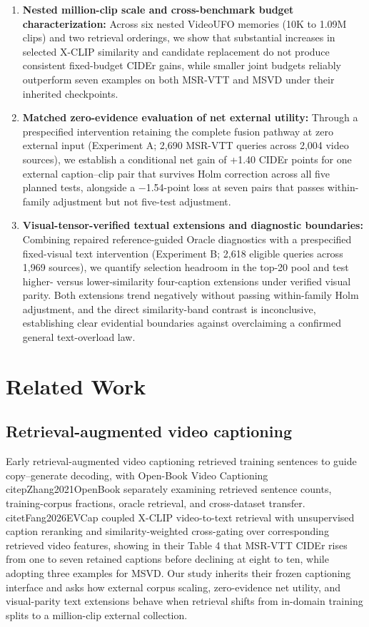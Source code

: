 \documentclass[11pt,a4paper]{article}
\begin{document}
\begin{enumerate}
\item \textbf{Nested million-clip scale and cross-benchmark budget characterization:} Across six nested VideoUFO memories (10K to 1.09M clips) and two retrieval orderings, we show that substantial increases in selected X-CLIP similarity and candidate replacement do not produce consistent fixed-budget CIDEr gains, while smaller joint budgets reliably outperform seven examples on both MSR-VTT and MSVD under their inherited checkpoints.
\item \textbf{Matched zero-evidence evaluation of net external utility:} Through a prespecified intervention retaining the complete fusion pathway at zero external input (Experiment A; 2,690 MSR-VTT queries across 2,004 video sources), we establish a conditional net gain of +1.40 CIDEr points for one external caption--clip pair that survives Holm correction across all five planned tests, alongside a $-$1.54-point loss at seven pairs that passes within-family adjustment but not five-test adjustment.
\item \textbf{Visual-tensor-verified textual extensions and diagnostic boundaries:} Combining repaired reference-guided Oracle diagnostics with a prespecified fixed-visual text intervention (Experiment B; 2,618 eligible queries across 1,969 sources), we quantify selection headroom in the top-20 pool and test higher- versus lower-similarity four-caption extensions under verified visual parity. Both extensions trend negatively without passing within-family Holm adjustment, and the direct similarity-band contrast is inconclusive, establishing clear evidential boundaries against overclaiming a confirmed general text-overload law.
\end{enumerate}
\section{Related Work}
\subsection{Retrieval-augmented video captioning}
Early retrieval-augmented video captioning retrieved training sentences to guide copy--generate decoding, with Open-Book Video Captioning \\citep{Zhang2021OpenBook} separately examining retrieved sentence counts, training-corpus fractions, oracle retrieval, and cross-dataset transfer. \\citet{Fang2026EVCap} coupled X-CLIP video-to-text retrieval with unsupervised caption reranking and similarity-weighted cross-gating over corresponding retrieved video features, showing in their Table 4 that MSR-VTT CIDEr rises from one to seven retained captions before declining at eight to ten, while adopting three examples for MSVD. Our study inherits their frozen captioning interface and asks how external corpus scaling, zero-evidence net utility, and visual-parity text extensions behave when retrieval shifts from in-domain training splits to a million-clip external collection.
\end{document}
